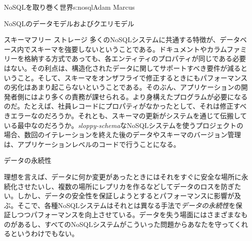 \begin{aosachapter}{NoSQLを取り巻く世界}{s:nosql}{Adam Marcus}
\begin{aosasect1}{NoSQLのデータモデルおよびクエリモデル}
\begin{aosasect2}{スキーマフリー ストレージ}
多くのNoSQLシステムに共通する特徴が、データベース内でスキーマを強要しないということである。ドキュメントやカラムファミリーを格納する方式であっても、各エンティティのプロパティが同じである必要はない。その利点は、構造化されたデータに関してサポートすべき要件が減るということ。そして、スキーマをオンザフライで修正するときにもパフォーマンスの劣化はあまり起こらないということである。そのぶん、アプリケーションの開発者側にはより多くの責務が課せられる。より身構えたプログラムが必要になるのだ。たとえば、社員レコードにプロパティがなかったとして、それは修正すべきエラーなのだろうか。それとも、スキーマの更新がシステムを通じて伝搬している最中なのだろうか。\emph{sloppy-schema}なNoSQLシステムを使うプロジェクトの場合、数回のイテレーションを終えた後のデータやスキーマのバージョン管理は、アプリケーションレベルのコードで行うことになる。

\end{aosasect2}

\end{aosasect1}

\begin{aosasect1}{データの永続性}

理想を言えば、データに何か変更があったときにはそれをすぐに安全な場所に永続化させたいし、複数の場所にレプリカを作るなどしてデータのロスを防ぎたい。しかし、データの安全性を保証しようとするとパフォーマンスに影響が及ぶ。そこで、各種NoSQLシステムはそれとは異なる手法で\emph{データの永続性}を保証しつつパフォーマンスを向上させている。データを失う場面にはさまざまなものがあるし、すべてのNoSQLシステムがこういった問題からあなたを守ってくれるというわけでもない。


\end{aosasect1}
\end{aosachapter}
